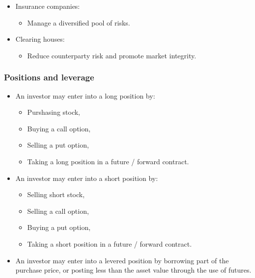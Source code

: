 \documentclass[../notes_compiled.tex]{subfiles}
\begin{document}
\begin{itemize}
\begin{itemize}
\item Insurance companies:
\begin{itemize}
\item Manage a diversified pool of risks.
\end{itemize}

\item Clearing houses:
\begin{itemize}
\item Reduce counterparty risk and promote market integrity.
\end{itemize}

\end{itemize}

\end{itemize}


\subsubsection{Positions and leverage}

\begin{itemize}
\item An investor may enter into a long position by:
\begin{itemize}
\item Purshasing stock,
\item Buying a call option,
\item Selling a put option,
\item Taking a long position in a future / forward contract.
\end{itemize}

\item An investor may enter into a short position by:
\begin{itemize}
\item Selling short stock,
\item Selling a call option,
\item Buying a put option,
\item Taking a short position in a future / forward contract.
\end{itemize}

\item An investor may enter into a levered position by borrowing part of the purchase price, or posting less than the asset value through the use of futures.

\end{itemize}
\end{document}
